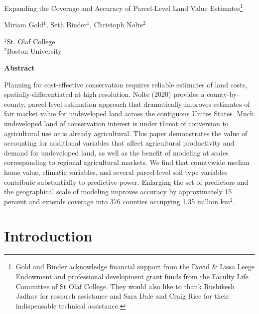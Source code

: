 \documentclass[12pt]{article}
\begin{document}
\hspace{5pt}

\Large
 \begin{center}
Expanding the Coverage and Accuracy of Parcel-Level Land Value Estimates\footnote[2]{Gold and Binder acknowledge financial support from the David \& Lissa Leege Endowment and professional development grant funds from the Faculty Life Committee of St Olaf College. They would also like to thank Rushikesh Jadhav for research assistance and Sara Dale and Craig Rice for their indispensable technical assistance.}\\ 

\vspace{10pt}

\large
Miriam Gold$^1$, Seth Binder$^1$, Christoph Nolte$^2$ \\

\vspace{10pt}

\footnotesize  
$^{1}$St. Olaf College\\
$^2$Boston University

\vspace{40pt} 

    \normalsize
    \textbf{Abstract}
\end{center}

\small
Planning for cost-effective conservation requires reliable estimates of land costs, spatially-differentiated at high resolution. Nolte (2020) provides a county-by-county, parcel-level estimation approach that dramatically improves estimates of fair market value for undeveloped land across the contiguous Unites States. Much undeveloped land of conservation interest is under threat of conversion to agricultural use or is already agricultural. This paper demonstrates the value of accounting for additional variables that affect agricultural productivity and demand for undeveloped land, as well as the benefit of modeling at scales corresponding to regional agricultural markets. We find that countywide median home value, climatic variables, and several parcel-level soil type variables contribute substantially to predictive power. Enlarging the set of predictors and the geographical scale of modeling improves accuracy by approximately 15 percent and extends coverage into 376 counties occupying 1.35 million km$^2$.

\newpage

\section{Introduction}
\end{document}
